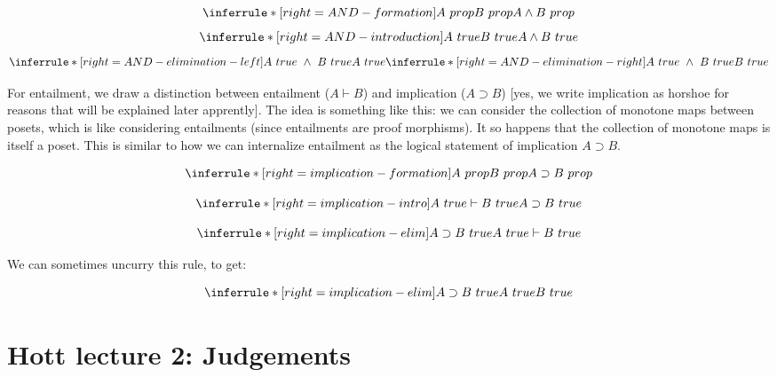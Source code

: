 \documentclass[11pt]{book}
\begin{document}
$$
\inferrule*[right=AND-formation]{A~prop\\B~prop}{A \land B~prop} 
$$
$$
\inferrule*[right=AND-introduction]{A~true\\B~true}{A \land B~true}
$$
$$
\inferrule*[right=AND-elimination-left]{A ~true~ \land ~B~ true}{A ~true}
\inferrule*[right=AND-elimination-right]{A ~true~ \land ~B~ true}{B ~true}
$$

For entailment, we draw a distinction between entailment ($A \vdash B$) and implication
($A \supset B$) [yes, we write implication as horshoe for reasons that will be explained later
apprently]. The idea is something like this: we can consider the collection of monotone maps 
between posets, which is like considering entailments (since entailments are proof morphisms). It so 
happens that the collection of monotone maps is itself a poset. This is similar to how we can
internalize entailment as the logical statement of implication $A \supset B$.

$$
\inferrule*[right=implication-formation]{A~prop\\B~prop}{A \supset B~prop}
$$

$$
\inferrule*[right=implication-intro]{A~true\vdash B~true}{A \supset B~true}
$$

$$
\inferrule*[right=implication-elim]{A \supset B~true}{A~true \vdash B~true}
$$

We can sometimes uncurry this rule, to get:

$$
\inferrule*[right=implication-elim]{A \supset B~true\\A~true}{B~true}
$$

\chapter{Hott lecture 2: Judgements}
\end{document}

